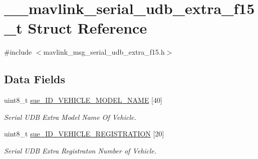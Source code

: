 \hypertarget{struct____mavlink__serial__udb__extra__f15__t}{\section{\+\_\+\+\_\+mavlink\+\_\+serial\+\_\+udb\+\_\+extra\+\_\+f15\+\_\+t Struct Reference}
\label{struct____mavlink__serial__udb__extra__f15__t}
}


{\ttfamily \#include $<$mavlink\+\_\+msg\+\_\+serial\+\_\+udb\+\_\+extra\+\_\+f15.\+h$>$}

\subsection*{Data Fields}
\begin{DoxyCompactItemize}
\item 
uint8\+\_\+t \hyperlink{struct____mavlink__serial__udb__extra__f15__t_a854d04c58910142eade4ce27f589ffa5}{sue\+\_\+\+I\+D\+\_\+\+V\+E\+H\+I\+C\+L\+E\+\_\+\+M\+O\+D\+E\+L\+\_\+\+N\+A\+M\+E} \mbox{[}40\mbox{]}
\begin{DoxyCompactList}\small\item\em Serial U\+D\+B Extra Model Name Of Vehicle. \end{DoxyCompactList}\item 
uint8\+\_\+t \hyperlink{struct____mavlink__serial__udb__extra__f15__t_ab469128a2de3aca61581cf967a9f3fb8}{sue\+\_\+\+I\+D\+\_\+\+V\+E\+H\+I\+C\+L\+E\+\_\+\+R\+E\+G\+I\+S\+T\+R\+A\+T\+I\+O\+N} \mbox{[}20\mbox{]}
\begin{DoxyCompactList}\small\item\em Serial U\+D\+B Extra Registraton Number of Vehicle. \end{DoxyCompactList}\end{DoxyCompactItemize}


